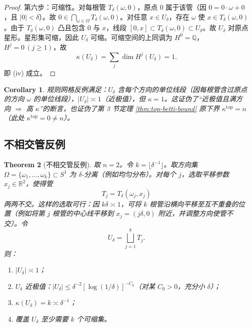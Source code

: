 \documentclass[11pt,a4paper]{article}
\newtheorem{theorem}{Theorem}[section]
\newtheorem{corollary}[theorem]{Corollary}
\theoremstyle{remark}
\begin{document}
\begin{proof}
		第六步：可缩性。对每根管 $T_\delta(\omega,0)$，原点 $0$ 属于该管（因 $0=0\cdot\omega+0$，且 $|0|<\delta$）。故 $0\in\bigcap_{\omega\in\Omega}T_\delta(\omega,0)$。对任意 $x\in U_\delta$，存在 $\omega$ 使 $x\in T_\delta(\omega,0)$。由于 $T_\delta(\omega,0)$ 凸且包含 $0$ 与 $x$，线段 $[0,x]\subset T_\delta(\omega,0)\subset U_\delta$。故 $U_\delta$ 对原点星形。星形集可缩，因此 $U_\delta$ 可缩。可缩空间的上同调为 $H^0=\mathbb Q$，$H^j=0\ (j\ge1)$，故
		\[\kappa(U_\delta)=\sum_j\dim H^j(U_\delta)=1.\]
		即 (iv) 成立。
		\end{proof}
		
		\begin{corollary}
		规则网格反例满足：$U_\delta$ 含每个方向的单位线段（因每根管含过原点的方向 $\omega$ 的单位线段），$|U_\delta|\asymp1$（近极值），但 $\kappa=1$。这证伪了“近极值且满方向 $\Rightarrow$ 高 $\kappa$”的断言，也证伪了第 3 节定理 \ref{thm:top-betti-bound} 原下界 $\kappa^{\mathrm{top}}=n$（此处 $\kappa^{\mathrm{top}}=0\neq n$）。
		\end{corollary}
		
		\subsection{不相交管反例}
		\begin{theorem}[不相交管反例]
		取 $n=2$。令 $k=\lfloor\delta^{-1}\rfloor$。取方向集 $\Omega=\{\omega_1,\ldots,\omega_k\}\subset S^1$ 为 $\delta$-分离（例如均匀分布）。对每个 $j$，选取平移参数 $x_j\in\mathbb R^2$，使得管
		\[T_j=T_\delta(\omega_j,x_j)\]
		两两不交。这样的选取可行：因 $k\delta\asymp1$，可将 $k$ 根管沿横向平移至互不重叠的位置（例如将第 $j$ 根管的中心线平移到 $x_j=(j\delta,0)$ 附近，并调整方向使管不交）。令
		\[U_\delta=\bigsqcup_{j=1}^k T_j.\]
		则：
		\begin{enumerate}
			\item[(i)] $|U_\delta|\asymp1$；
			\item[(ii)] $U_\delta$ 近极值：$|U_\delta|\le\delta^{-2}[\log(1/\delta)]^{-C_0}$（对某 $C_0>0$，充分小 $\delta$）；
			\item[(iii)] $\kappa(U_\delta)=k\asymp\delta^{-1}$；
			\item[(iv)] 覆盖 $U_\delta$ 至少需要 $k$ 个可缩集。
		\end{enumerate}
		\end{theorem}
		
\end{document}
